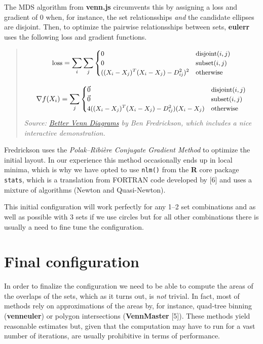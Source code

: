 \documentclass[
  headsepline=true,headings=standardclasses%
]{scrartcl}
\theoremstyle{definition}
\theoremstyle{definition}
\theoremstyle{remark}
\begin{document}
The MDS algorithm from \textbf{venn.js} circumvents this by assigning a
loss and gradient of 0 when, for instance, the set relationsships
\emph{and} the candidate ellipses are disjoint. Then, to optimize the
pairwise relationsships between sets, \textbf{eulerr} uses the following
loss and gradient functions.

\begin{quote}
\[\small
\text{loss} = \sum_i \sum_j { {\begin{cases}
    0 & \text{disjoint}(i, j)\\ 
    0 & \text{subset}(i, j)\\ 
    ((X_{i} - X_{j})^T(X_{i} - X_{j}) - D_{ij}^2) ^2  & \text{otherwise} \\ 
\end{cases}}}
\]

\[\small
\nabla f(X_{i}) = \sum_j {\begin{cases}
     \vec{0} & \text{disjoint}(i, j)\\ 
     \vec{0} & \text{subset}(i, j)\\ 
     4 {((X_{i} - X_{j})^T(X_{i} - X_{j}) - D_{ij}^2)} (X_{i} -
     X_{j}) & \text{otherwise} \\ 
\end{cases}}\] \emph{Source:
\href{http://www.benfrederickson.com/better-venn-diagrams/}{Better Venn
Diagrams} by Ben Fredrickson, which includes a nice interactive
demonstration.}
\end{quote}

Fredrickson uses the \emph{Polak--Ribière Conjugate Gradient Method} to
optimize the initial layout. In our experience this method occasionally
ends up in local minima, which is why we have opted to use
\texttt{nlm()} from the \textbf{R} core package \texttt{stats}, which is
a translation from FORTRAN code developed by {[}6{]} and uses a mixture
of algorithms (Newton and Quasi-Newton).

This initial configuration will work perfectly for any 1--2 set
combinations and as well as possible with 3 sets if we use circles but
for all other combinations there is usually a need to fine tune the
configuration.

\section{Final configuration}\label{final-configuration}

In order to finalize the configuration we need to be able to compute the
areas of the overlaps of the sets, which as it turns out, is \emph{not}
trivial. In fact, most of methods rely on approximations of the areas
by, for instance, quad-tree binning (\textbf{venneuler}) or polygon
intersections (\textbf{VennMaster} {[}5{]}). These methods yield
reasonable estimates but, given that the computation may have to run for
a vast number of iterations, are usually prohibitive in terms of
performance.
\end{document}
